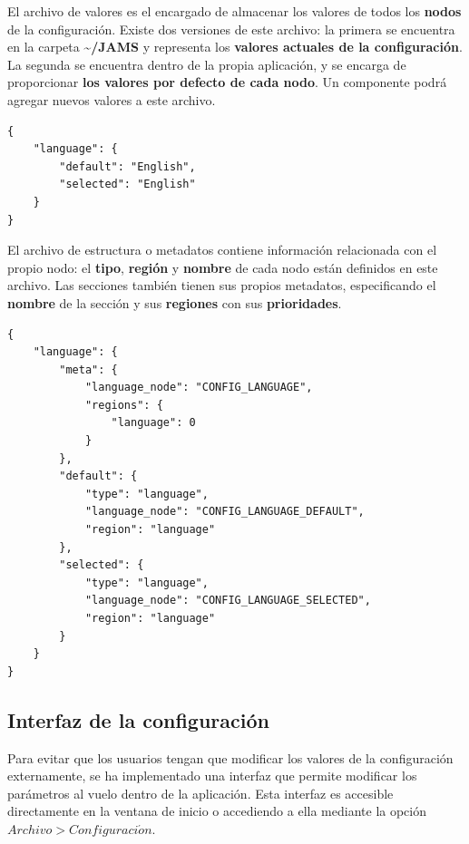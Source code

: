 El archivo de valores es el encargado de almacenar los valores de
todos los \textbf{nodos} de la configuración.
Existe dos versiones de este archivo:
la primera se encuentra en la carpeta \textbf{\textasciitilde/JAMS} y representa los \textbf{valores
actuales de la configuración}.
La segunda se encuentra dentro de la propia aplicación, y se encarga de
proporcionar \textbf{los valores por defecto de cada nodo}.
Un componente podrá agregar nuevos valores a este archivo.

\begin{lstlisting}[frame=single,label={lst:main_config.json}]
{
    "language": {
        "default": "English",
        "selected": "English"
    }
}
\end{lstlisting}

El archivo de estructura o metadatos contiene información
relacionada con el propio nodo: el \textbf{tipo}, \textbf{región}
y \textbf{nombre} de cada nodo están definidos en este archivo.
Las secciones también tienen sus propios metadatos, especificando
el \textbf{nombre} de la sección y sus \textbf{regiones} con sus
\textbf{prioridades}.

\begin{lstlisting}[frame=single,label={lst:main_config_meta.json}]
{
    "language": {
        "meta": {
            "language_node": "CONFIG_LANGUAGE",
            "regions": {
                "language": 0
            }
        },
        "default": {
            "type": "language",
            "language_node": "CONFIG_LANGUAGE_DEFAULT",
            "region": "language"
        },
        "selected": {
            "type": "language",
            "language_node": "CONFIG_LANGUAGE_SELECTED",
            "region": "language"
        }
    }
}
\end{lstlisting}

\subsection{Interfaz de la configuración}\label{subsec:interfaz-de-la-configuración}

Para evitar que los usuarios tengan que modificar los valores de la configuración
externamente, se ha implementado una interfaz que permite modificar los
parámetros al vuelo dentro de la aplicación.
Esta interfaz es accesible directamente en la ventana de inicio o accediendo a ella
mediante la opción $Archivo > Configuraci\acute on$.


